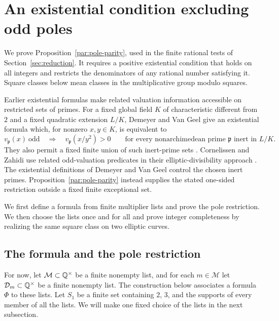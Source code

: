 \section{An existential condition excluding odd poles}\label{par:section}

We prove Proposition~\ref{par:pole-parity}, used in the finite rational
tests of Section~\ref{sec:reduction}.  It requires a positive existential
condition that holds on all integers and restricts the denominators of any
rational number satisfying it.  Square classes below mean classes in the
multiplicative group modulo squares.

Earlier existential formulas make related valuation information
accessible on restricted sets of primes.  For a fixed global field
\(K\) of characteristic different from \(2\) and a fixed quadratic
extension \(L/K\), Demeyer and Van Geel give an existential formula
which, for nonzero \(x,y\in K\), is equivalent to
\[
 v_{\mathfrak p}(x)\ \text{odd}
 \quad\Longrightarrow\quad
 v_{\mathfrak p}(x/y^2)>0
 \qquad
 \text{for every nonarchimedean prime \(\mathfrak p\) inert in \(L/K\)}.
\]
They also permit a fixed finite union of such inert-prime sets
\cite[Theorem~14 and Corollary~15 in the author version]{DemeyerVanGeel2006}.
Cornelissen and Zahidi use related odd-valuation predicates in their
elliptic-divisibility approach
\cite[Sections~3.3 and~3.11]{CornelissenZahidi2007}.
The existential definitions of Demeyer and Van Geel control the
chosen inert primes.
Proposition~\ref{par:pole-parity} instead supplies the stated
one-sided restriction outside a fixed finite exceptional set.

We first define a formula from finite multiplier lists and prove the
pole restriction. We then choose the lists once and for all and prove
integer completeness by realizing the same square class on two elliptic
curves.

\subsection{The formula and the pole restriction}

For now, let $\mathcal M\subset\mathbb Q^\times$ be a finite nonempty list,
and for each $m\in\mathcal M$ let $\mathcal D_m\subset\mathbb Q^\times$
be a finite nonempty list. The construction below associates a formula
$\Phi$ to these lists. Let $S_1$ be a finite set containing $2$, $3$,
and the supports of every member of all the lists. We will make one
fixed choice of the lists in the next subsection.

